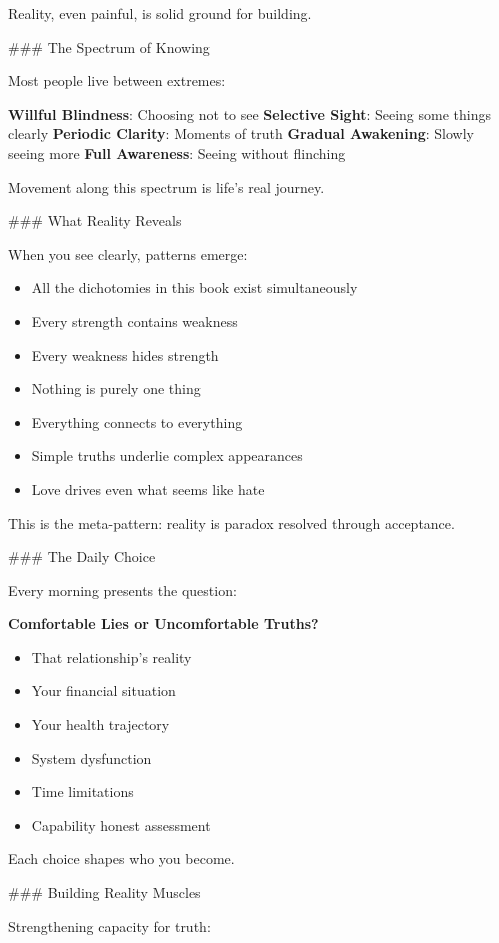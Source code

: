 \documentclass[12pt]{book}
\begin{document}
Reality, even painful, is solid ground for building.

\#\#\# The Spectrum of Knowing

Most people live between extremes:

\textbf{Willful Blindness}: Choosing not to see
\textbf{Selective Sight}: Seeing some things clearly
\textbf{Periodic Clarity}: Moments of truth
\textbf{Gradual Awakening}: Slowly seeing more
\textbf{Full Awareness}: Seeing without flinching

Movement along this spectrum is life's real journey.

\#\#\# What Reality Reveals

When you see clearly, patterns emerge:

\begin{itemize}
\item All the dichotomies in this book exist simultaneously
\item Every strength contains weakness
\item Every weakness hides strength  
\item Nothing is purely one thing
\item Everything connects to everything
\item Simple truths underlie complex appearances
\item Love drives even what seems like hate

\end{itemize}
This is the meta-pattern: reality is paradox resolved through acceptance.

\#\#\# The Daily Choice

Every morning presents the question:

\textbf{Comfortable Lies or Uncomfortable Truths?}
\begin{itemize}
\item That relationship's reality
\item Your financial situation
\item Your health trajectory
\item System dysfunction
\item Time limitations
\item Capability honest assessment

\end{itemize}
Each choice shapes who you become.

\#\#\# Building Reality Muscles

Strengthening capacity for truth:
\end{document}
